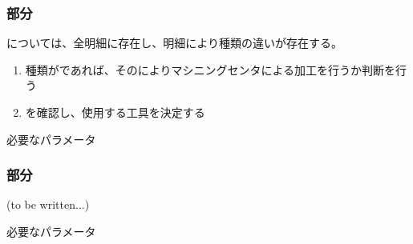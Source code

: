 \clearpage
\subsubsection{\EndFaceChamferMilling 部分}
\EndFaceChamferMilling については、全明細に存在し、明細により種類の違いが存在する。
\begin{enumerate}[label=\sarrow]
\item 種類が\EndFaceCChamfer であれば、その\EndFaceCChamferLength によりマシニングセンタによる加工を行うか判断を行う
\item \EndFaceCChamferAngle を確認し、使用する工具を決定する
\end{enumerate}
\begin{Parameter}{必要なパラメータ}
\PMChamferType%
\PMTopEndFaceOutCChamferLength
\PMTopEndFaceOutCChamferAngle%
\PMTopOutcutExists\\
\PMBottomEndFaceOutCChamferLength%
\PMBottomEndFaceOutCChamferAngle%
\PMBottomOutcutExists%
\end{Parameter}

\subsubsection{\EndFaceBoringMilling 部分\TBW}
(to be written...)
\begin{Parameter}{必要なパラメータ}
\PMEndFaceBoringExists%
\PMEndFaceBoringCornerR%
\end{Parameter}

